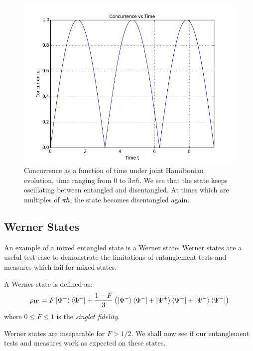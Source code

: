 \begin{center}
\begin{figure}[H]
  \begin{center}
    \includegraphics[scale=0.62]{figures/timeevolution-10.png}
    \caption{Concurrence as a function of time under joint Hamiltonian evolution, time ranging from 0 to $3\pi\hbar$. \newline We see that the state keeps oscillating between entangled and disentangled. At times which are multiples of $\pi\hbar$, the state becomes disentangled again.}
    \label{fig: Time Evolution: Concurrence (extended)}
  \end{center}
\end{figure}
\end{center}

\pagebreak

\subsection{Werner States}
An example of a mixed entangled state is a Werner state. Werner states are a useful test case to demonstrate the limitations of entanglement tests and measures which fail for mixed states.
\par A Werner state is defined as:
\begin{align*}
\rho_W = F \ket{\Phi^+} \bra{\Phi^+} + \frac{1-F}{3} \left( \ket{\Phi^-} \bra{\Phi^-} + \ket{\Psi^+} \bra{\Psi^+} + \ket{\Psi^-} \bra{\Psi^-} \right)
\end{align*}
where $0 \leq F \leq 1$ is the \textit{singlet fidelity}.
\par Werner states are inseparable for $F > 1/2$. We shall now see if our entanglement tests and measures work as expected on these states.

